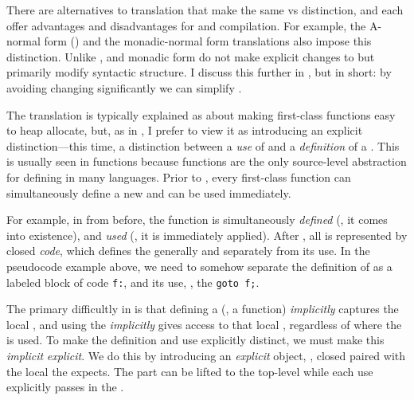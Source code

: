There are alternatives to  translation that make the same 
vs  distinction, and each offer advantages and disadvantages
for  and compilation.
For example, the A-normal form () and the monadic-normal form
translations also impose this distinction.
Unlike ,  and monadic form do not make explicit changes to
 but primarily modify syntactic structure.
I discuss this further in , but in short: by avoiding
changing  significantly we can simplify .

The  translation is typically
explained as about making
first-class functions easy to heap allocate, but, as in , I prefer to
view it as introducing an explicit distinction---this time, a distinction
between a \emph{use} of  and a \emph{definition} of a
.
This is usually seen in functions because functions are the only source-level
abstraction for defining  in many languages.
Prior to , every first-class function can simultaneously
define a new  and can be used immediately.

For example, in \im{\seone = \sappe{(\snfune{\sx}{\sx})}{\struee}} from before, the
function \im{\snfune{\sx}{\sx}} is simultaneously \emph{defined} (\ie, it comes into
existence), and \emph{used} (\ie, it is immediately applied).
After , all  is represented by closed
\emph{code}, which defines the  generally and separately from
its use.
In the pseudocode example above, we need to somehow separate the definition of
\im{(\snfune{\sx}{\sx})} as a labeled block of code \texttt{f:}, and its
use, \ie, the \texttt{goto f;}.

The primary difficultly in  is that defining a
 (\eg, a function) \emph{implicitly} captures the local
, and using the  \emph{implicitly} gives
access to that local , regardless of where the
 is used.
To make the definition and use explicitly distinct, we must make this
\emph{implicit}  \emph{explicit}.
We do this by introducing an \emph{explicit}
 object, \ie,
closed  paired with the local  the
 expects.
The  part can be lifted to the top-level while each use explicitly
passes in the .

